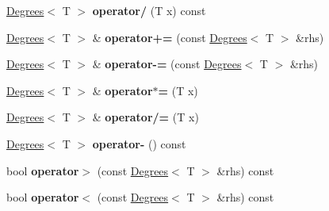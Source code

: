 \begin{DoxyCompactItemize}
\item 
\hypertarget{struct_d_r_d_s_p_1_1_degrees_a988b52b56bf17ea5676b2584bd808532}{\hyperlink{struct_d_r_d_s_p_1_1_degrees}{Degrees}$<$ T $>$ {\bfseries operator/} (T x) const }\label{struct_d_r_d_s_p_1_1_degrees_a988b52b56bf17ea5676b2584bd808532}

\item 
\hypertarget{struct_d_r_d_s_p_1_1_degrees_aa4feef45aa496d9dc4b64612ed3fcd06}{\hyperlink{struct_d_r_d_s_p_1_1_degrees}{Degrees}$<$ T $>$ \& {\bfseries operator+=} (const \hyperlink{struct_d_r_d_s_p_1_1_degrees}{Degrees}$<$ T $>$ \&rhs)}\label{struct_d_r_d_s_p_1_1_degrees_aa4feef45aa496d9dc4b64612ed3fcd06}

\item 
\hypertarget{struct_d_r_d_s_p_1_1_degrees_aec831bd12465f0318ba18ed43ca61a3b}{\hyperlink{struct_d_r_d_s_p_1_1_degrees}{Degrees}$<$ T $>$ \& {\bfseries operator-\/=} (const \hyperlink{struct_d_r_d_s_p_1_1_degrees}{Degrees}$<$ T $>$ \&rhs)}\label{struct_d_r_d_s_p_1_1_degrees_aec831bd12465f0318ba18ed43ca61a3b}

\item 
\hypertarget{struct_d_r_d_s_p_1_1_degrees_ab263b47af616996e14eb97fda5805791}{\hyperlink{struct_d_r_d_s_p_1_1_degrees}{Degrees}$<$ T $>$ \& {\bfseries operator$\ast$=} (T x)}\label{struct_d_r_d_s_p_1_1_degrees_ab263b47af616996e14eb97fda5805791}

\item 
\hypertarget{struct_d_r_d_s_p_1_1_degrees_aa6ea9f7da8d6cb527c6a565449e07378}{\hyperlink{struct_d_r_d_s_p_1_1_degrees}{Degrees}$<$ T $>$ \& {\bfseries operator/=} (T x)}\label{struct_d_r_d_s_p_1_1_degrees_aa6ea9f7da8d6cb527c6a565449e07378}

\item 
\hypertarget{struct_d_r_d_s_p_1_1_degrees_a5e19aa3c231ee3ae31fddc109b8c913c}{\hyperlink{struct_d_r_d_s_p_1_1_degrees}{Degrees}$<$ T $>$ {\bfseries operator-\/} () const }\label{struct_d_r_d_s_p_1_1_degrees_a5e19aa3c231ee3ae31fddc109b8c913c}

\item 
\hypertarget{struct_d_r_d_s_p_1_1_degrees_a2f44722460deba00a72caae7b275cec3}{bool {\bfseries operator$>$} (const \hyperlink{struct_d_r_d_s_p_1_1_degrees}{Degrees}$<$ T $>$ \&rhs) const }\label{struct_d_r_d_s_p_1_1_degrees_a2f44722460deba00a72caae7b275cec3}

\item 
\hypertarget{struct_d_r_d_s_p_1_1_degrees_a7b2efa68737b7f423ff8e23c23fdad7a}{bool {\bfseries operator$<$} (const \hyperlink{struct_d_r_d_s_p_1_1_degrees}{Degrees}$<$ T $>$ \&rhs) const }\label{struct_d_r_d_s_p_1_1_degrees_a7b2efa68737b7f423ff8e23c23fdad7a}


\end{DoxyCompactItemize}

